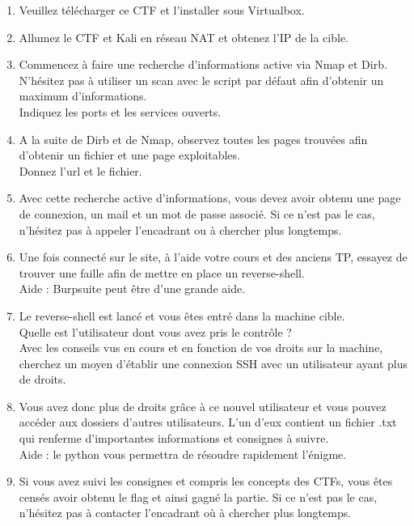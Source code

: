 \begin{enumerate}
    \item Veuillez télécharger ce CTF et l’installer sous Virtualbox.
    \item Allumez le CTF et Kali en réseau NAT et obtenez l’IP de la cible.
    \item Commencez à faire une recherche d’informations active via Nmap et Dirb. N’hésitez pas à utiliser un scan avec le script par défaut afin d’obtenir un maximum d’informations.\\
    Indiquez les ports et les services ouverts.
    \item A la suite de Dirb et de Nmap, observez toutes les pages trouvées afin d’obtenir un fichier et une page exploitables.\\
    Donnez l’url et le fichier.
    \item Avec cette recherche active d’informations, vous devez avoir obtenu une page de connexion, un mail et un mot de passe associé. Si ce n’est pas le cas, n’hésitez pas à appeler l’encadrant ou à chercher plus longtemps.
    \item Une fois connecté sur le site, à l’aide votre cours et des anciens TP, essayez de trouver une faille afin de mettre en place un reverse-shell.\\
    Aide : Burpsuite peut être d’une grande aide.
    \item Le reverse-shell est lancé et vous êtes entré dans la machine cible.\\
    Quelle est l’utilisateur dont vous avez pris le contrôle ?\\
    Avec les conseils vus en cours et en fonction de vos droits sur la machine, cherchez un moyen d’établir une connexion SSH avec un utilisateur ayant plus de droits.
    \item Vous avez donc plus de droits grâce à ce nouvel utilisateur et vous pouvez accéder aux dossiers d’autres utilisateurs. L’un d’eux contient un fichier .txt qui renferme d’importantes informations et consignes à suivre.\\
    Aide : le python vous permettra de résoudre rapidement l’énigme.
    \item Si vous avez suivi les consignes et compris les concepts des CTFs, vous êtes censés avoir obtenu le flag et ainsi gagné la partie. Si ce n’est pas le cas, n’hésitez pas à contacter l’encadrant où à chercher plus longtemps.
\end{enumerate}
